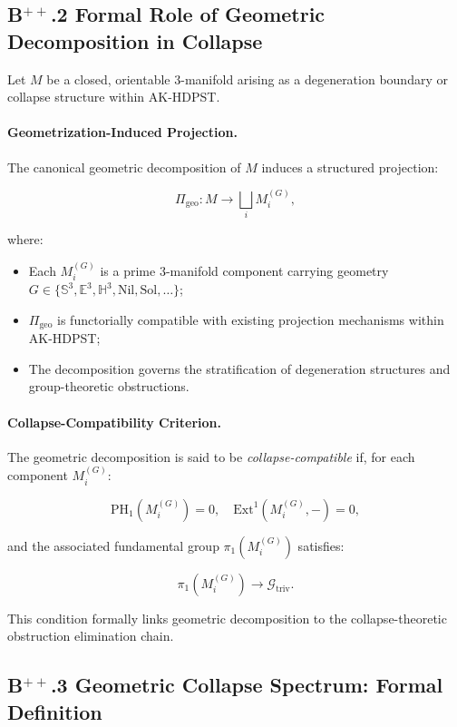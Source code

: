\documentclass[11pt]{article}
\begin{document}
\subsection*{B$^{++}$.2 Formal Role of Geometric Decomposition in Collapse}

Let $M$ be a closed, orientable $3$-manifold arising as a degeneration boundary or collapse structure within AK-HDPST.

\paragraph{Geometrization-Induced Projection.}  
The canonical geometric decomposition of $M$ induces a structured projection:

\[
\Pi_{\mathrm{geo}} : M \longrightarrow \bigsqcup_i M_i^{(G)},
\]

where:

\begin{itemize}
    \item Each $M_i^{(G)}$ is a prime $3$-manifold component carrying geometry $G \in \{ \mathbb{S}^3, \mathbb{E}^3, \mathbb{H}^3, \mathrm{Nil}, \mathrm{Sol}, \ldots \}$;
    \item $\Pi_{\mathrm{geo}}$ is functorially compatible with existing projection mechanisms within AK-HDPST;
    \item The decomposition governs the stratification of degeneration structures and group-theoretic obstructions.
\end{itemize}

\paragraph{Collapse-Compatibility Criterion.}  
The geometric decomposition is said to be \emph{collapse-compatible} if, for each component $M_i^{(G)}$:

\[
\mathrm{PH}_1(M_i^{(G)}) = 0,\quad \mathrm{Ext}^1(M_i^{(G)}, -) = 0,
\]

and the associated fundamental group $\pi_1(M_i^{(G)})$ satisfies:

\[
\pi_1(M_i^{(G)}) \longrightarrow \mathcal{G}_{\mathrm{triv}}.
\]

This condition formally links geometric decomposition to the collapse-theoretic obstruction elimination chain.

\subsection*{B$^{++}$.3 Geometric Collapse Spectrum: Formal Definition}
\end{document}
